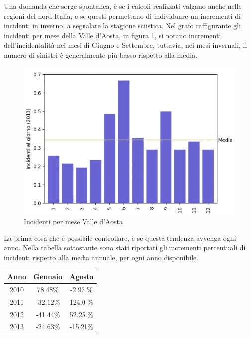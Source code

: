 \documentclass[a4paper,12pt]{report}
\begin{document}
Una domanda che sorge spontanea, è se i calcoli realizzati valgano anche nelle regioni 
del nord Italia, e se questi permettano di individuare un incrementi di incidenti in 
inverno, a segnalare la stagione sciistica.
Nel grafo raffigurante gli incidenti per mese della Valle d'Aosta, 
in figura \ref{fig:aosta}, si notano incrementi dell'incidentalità 
nei mesi di Giugno e Settembre, tuttavia, nei mesi invernali, il numero di sinistri è 
generalmente più basso rispetto alla media.

\begin{figure}
    \includegraphics[width=\linewidth]{../src/incidenti/incidenti_senza_coords/mese_incidenti/aosta_mese.png}
    \caption{Incidenti per mese Valle d'Aosta}
    \label{fig:aosta}
\end{figure}

La prima cosa che è possibile controllare, è se questa tendenza avvenga ogni anno. 
Nella tabella sottostante sono stati riportati gli incrementi percentuali di incidenti 
rispetto alla media annuale, per ogni anno disponibile.

\begin{center}
    \def\arraystretch{1.5}%
    \begin{tabular}{ |c|c|c| } 
    \hline
    Anno & Gennaio & Agosto \\ 
    \hline
    \rowcolor{TableGray}
    2010 & 78.48\%  & -2.93 \%\\ 
    2011 & -32.12\% & 124.0 \%\\
    \rowcolor{TableGray}
    2012 & -41.44\% & 52.25 \% \\
    2013 & -24.63\% & -15.21\% \\
    \hline
    \end{tabular}
\end{center}
\end{document}
